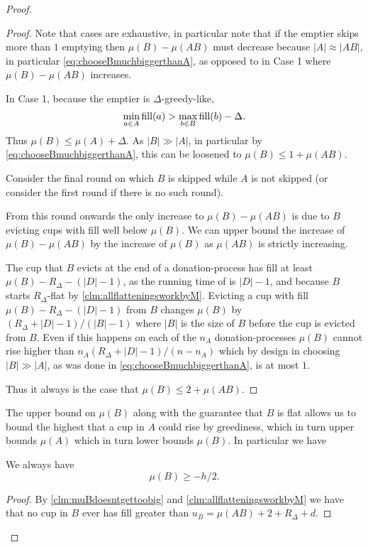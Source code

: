 \begin{proof}
\begin{proof}
  Note that cases are exhaustive, in particular note that if the
  emptier skips more than $1$ emptying then $\mu(B) - \mu(AB)$
  must decrease because $|A|\approx |AB|$, in particular
  \eqref{eq:chooseBmuchbiggerthanA}, as opposed to in Case 1
  where $\mu(B) - \mu(AB)$ increases.

  In Case 1, because the emptier is $\Delta$-greedy-like,
  $$\min_{a\in A} \operatorname{\textnormal{fill}}(a) > \max_{b\in B} \operatorname{\textnormal{fill}}(b) - \Delta.$$
  Thus $\mu(B) \le \mu(A) + \Delta$. As $|B| \gg |A|$, in
  particular by \eqref{eq:chooseBmuchbiggerthanA}, this can be
  loosened to $\mu(B) \le 1 + \mu(A B)$.

  Consider the final round on which $B$ is skipped while $A$ is
  not skipped (or consider the first round if there is no such
  round).

  From this round onwards the only increase to $\mu(B) - \mu(A
  B)$ is due to $B$ evicting cups with fill well below $\mu(B)$.
  We can upper bound the increase of $\mu(B) - \mu(A B)$ by the
  increase of $\mu(B)$ as $\mu(A B)$ is strictly increasing.

  The cup that $B$ evicts at the end of a
  donation-process has fill at least $\mu(B) - R_\Delta -
  (|D|-1)$, as the running time of \randalg is $|D|-1$, and
  because $B$ starts $R_\Delta$-flat by
  \cref{clm:allflatteningsworkbyM}. Evicting a cup
  with fill $\mu(B) - R_\Delta - (|D| -1)$ from $B$ changes
  $\mu(B)$ by $(R_\Delta + |D| - 1) / (|B|-1)$ where $|B|$ is the
  size of $B$ before the cup is evicted from $B$. Even if this
  happens on each of the $n_A$ donation-processes $\mu(B)$ cannot
  rise higher than $n_A (R_\Delta + |D|-1) / (n-n_A)$ which by
  design in choosing $|B| \gg |A|$, as was done in
  \eqref{eq:chooseBmuchbiggerthanA}, is at most $1$.

  Thus it always is the case that $\mu(B) \le 2 + \mu(A B).$

\end{proof}

The upper bound on $\mu(B)$ along with the guarantee that $B$ is
flat allows us to bound the highest that a cup in $A$ could rise
by greediness, which in turn upper bounds $\mu(A)$ which in turn
lower bounds $\mu(B)$. In particular we have
\begin{clm}
  \label{clm:muBgreaterthanminushover2}
  We always have
  $$\mu(B) \ge -h/2.$$
\end{clm}
\begin{proof}
  By \cref{clm:muBdoesntgettoobig} and \cref{clm:allflatteningsworkbyM} 
  we have that no cup in $B$ ever has fill greater than
  $u_B = \mu(A B) + 2 + R_\Delta + d$. 


\end{proof}
\end{proof}
